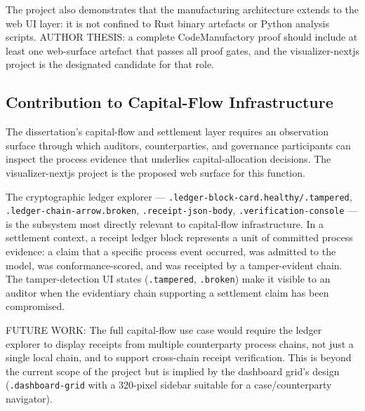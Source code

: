The project also demonstrates that the manufacturing architecture extends to the web UI layer:
it is not confined to Rust binary artefacts or Python analysis scripts. AUTHOR THESIS: a
complete CodeManufactory proof should include at least one web-surface artefact that passes
all proof gates, and the visualizer-nextjs project is the designated candidate for that role.

\subsection{Contribution to Capital-Flow Infrastructure}
\label{sec:experiments-visualizer-nextjs-contribution-capital}

The dissertation's capital-flow and settlement layer requires an observation surface through
which auditors, counterparties, and governance participants can inspect the process evidence
that underlies capital-allocation decisions. The visualizer-nextjs project is the proposed
web surface for this function.

The cryptographic ledger explorer --- \texttt{.ledger-block-card.healthy/.tampered},
\texttt{.ledger-chain-arrow.broken}, \texttt{.receipt-json-body},
\texttt{.verification-console} --- is the subsystem most directly relevant to capital-flow
infrastructure. In a settlement context, a receipt ledger block represents a unit of
committed process evidence: a claim that a specific process event occurred, was admitted to
the model, was conformance-scored, and was receipted by a tamper-evident chain. The
tamper-detection UI states (\texttt{.tampered}, \texttt{.broken}) make it visible to an
auditor when the evidentiary chain supporting a settlement claim has been compromised.

FUTURE WORK: The full capital-flow use case would require the ledger explorer to display
receipts from multiple counterparty process chains, not just a single local chain, and
to support cross-chain receipt verification. This is beyond the current scope of the
project but is implied by the dashboard grid's design (\texttt{.dashboard-grid} with
a 320-pixel sidebar suitable for a case/counterparty navigator).
